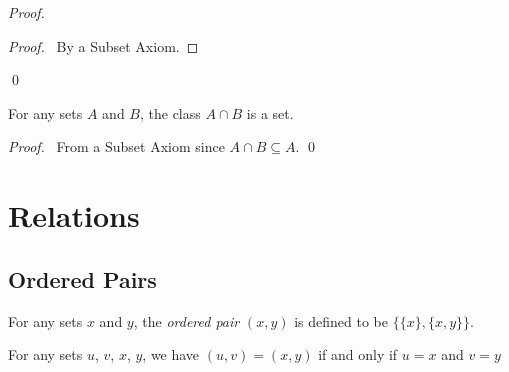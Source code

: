 \begin{proof}
    \pf
    \qedstep
    \begin{proof}
        \pf\ By a Subset Axiom.
    \end{proof}
    \qed
\end{proof}

\begin{theorem}[Subset]
    For any sets $A$ and $B$, the class $A \cap B$ is a set.
\end{theorem}

\begin{proof}
    \pf\ From a Subset Axiom since $A \cap B \subseteq A$. \qed
\end{proof}

\chapter{Relations}

\section{Ordered Pairs}

\begin{definition}
    For any sets $x$ and $y$, the \emph{ordered pair} $(x,y)$ is defined to be $\{ \{ x \}, \{ x , y \} \}$.    
\end{definition}

\begin{theorem}[Pairing]
    For any sets $u$, $v$, $x$, $y$, we have $(u,v) = (x,y)$ if and only if $u = x$ and $v = y$
\end{theorem}


